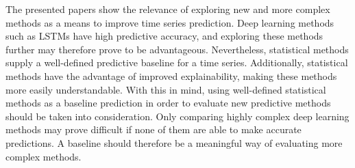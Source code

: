 The presented papers show the relevance of exploring new and more complex methods as a means to improve time series prediction.
Deep learning methods such as LSTMs have high predictive accuracy,
and exploring these methods further may therefore prove to be advantageous.
Nevertheless, statistical methods supply a well-defined predictive baseline for a time series.
Additionally, statistical methods have the advantage of improved explainability,
making these methods more easily understandable.
With this in mind, using well-defined statistical methods as a baseline prediction in order to evaluate new predictive methods should be taken into consideration.
Only comparing highly complex deep learning methods may prove difficult if none of them are able to make accurate predictions.
A baseline should therefore be a meaningful way of evaluating more complex methods.


\iffalse
The paper \cite{Bandara2017} points out that in non-stationary time series, the distant past is typically less
useful for forecast, as underlying patterns and relationships will have changed in the meantime.

In \autoref{section:RelatedWork:forecasting-ecommerce}
we highlighted ANNs ability to outperform statistical methods when macro-economic 
conditions were unstable.
In \autoref{section:RelatedWork:Model-structure} we mentioned how statistical models
potentially missed the bigger picture in a domain of many related time series.
These findings makes it clear to us that limiting our solution to a statistical method
will be a mistake, and exploring a more complicated ANN model seems beneficial.
However, a need for a baseline model in order to compare the results of the ANN model,
a statistical method, like SARIMA could be useful.
\fi
